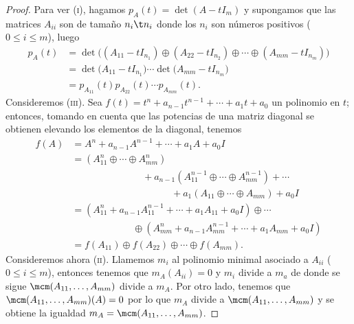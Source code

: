 	\begin{proof}
		Para ver \textsc{(i)}, hagamos $p_A(t) = \det(A-tI_m)$ y supongamos que las matrices $A_{ii}$ son de tamaño $n_i\t n_i$ donde los $n_i$ son números positivos ($0\leq i\leq m$), luego
		\begin{align*}
			p_A(t) &=\det\big((A_{11} - tI_{n_1})\oplus(A_{22} - tI_{n_2})\oplus\cdots\oplus(A_{mm} - tI_{n_m})\big)  \\
			&=\det\big(A_{11} - tI_{n_1}\big)\cdots\det\big(A_{mm} - tI_{n_m}\big) \\
			&=p_{A_{11}}(t)p_{A_{22}}(t)\cdots p_{A_{mm}}(t).
		\end{align*}
	Consideremos (\textsc{iii}). Sea $f(t) = t^n+a_{n-1}t^{n-1}+\cdots+a_1t+a_0$ un polinomio en $t$; entonces, tomando en cuenta que las potencias de una matriz diagonal se obtienen elevando los elementos de la diagonal, tenemos
		\begin{align*}
		f(A)  &= A^n+a_{n-1}A^{n-1}+\cdots+a_1A+a_0I \\
		&= (A_{11}^n\oplus\cdots\oplus A_{mm}^n) \\
		&\phantom{=}\hspace{6em} + a_{n-1}(A_{11}^{n-1}\oplus\cdots\oplus A_{mm}^{n-1})+\cdots \\
		&\phantom{=}\hspace{9em} +a_1(A_{11}\oplus\cdots\oplus A_{mm}) + a_0 I \\
		&=(A_{11}^n+a_{n-1}A_{11}^{n-1}+\cdots+a_1A_{11}+a_0I)\oplus\cdots\\
		&\phantom{=}\hspace{5em} \oplus(A_{mm}^n+a_{n-1}A_{mm}^{n-1}+\cdots+a_1A_{mm}+a_0I) \\
		&= f(A_{11})\oplus f(A_{22})\oplus\cdots\oplus f(A_{mm}).
		\end{align*}
	Consideremos ahora (\textsc{ii}). Llamemos $m_i$ al polinomio minimal asociado a $A_{ii}$ ($0\leq i\leq m$), entonces tenemos que $m_A(A_{ii}) = 0$ y $m_i$ divide a $m_a$ de donde se sigue $\mcm(A_{11},\dots,A_{mm})$ divide a $m_A$. Por otro lado, tenemos que $\mcm(A_{11},\dots,A_{mm})(A) = 0$ por lo que $m_A$ divide a $\mcm(A_{11},\dots,A_{mm})$ y se obtiene la igualdad $m_A = \mcm(A_{11},\dots,A_{mm})$.
	\end{proof}
